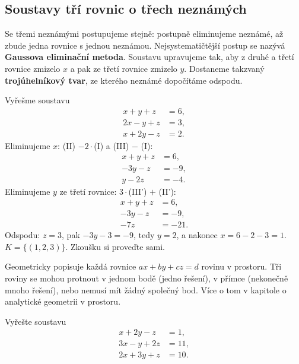 \subsection{Soustavy tří rovnic o třech neznámých}

Se třemi neznámými postupujeme stejně: postupně eliminujeme neznámé, až zbude jedna rovnice s jednou neznámou. Nejsystematičtější postup se nazývá \textbf{Gaussova eliminační metoda}. Soustavu upravujeme tak, aby z druhé a třetí rovnice zmizelo $x$ a pak ze třetí rovnice zmizelo $y$. Dostaneme takzvaný \textbf{trojúhelníkový tvar}, ze kterého neznámé dopočítáme odspodu.

\begin{example}
  Vyřešme soustavu
  \begin{align*}
    x + y + z &= 6, \tag{I}\\
    2x - y + z &= 3, \tag{II}\\
    x + 2y - z &= 2. \tag{III}
  \end{align*}
  Eliminujeme $x$: (II) $- 2\cdot$(I) a (III) $-$ (I):
  \begin{align*}
    x + y + z &= 6,\\
    -3y - z &= -9,\\
    y - 2z &= -4.
  \end{align*}
  Eliminujeme $y$ ze třetí rovnice: $3\cdot$(III') $+$ (II'):
  \begin{align*}
    x + y + z &= 6,\\
    -3y - z &= -9,\\
    -7z &= -21.
  \end{align*}
  Odspodu: $z = 3$, pak $-3y - 3 = -9$, tedy $y = 2$, a nakonec $x = 6 - 2 - 3 = 1$. $K = \{(1, 2, 3)\}$. Zkoušku si proveďte sami.
\end{example}

\begin{note}
  Geometricky popisuje každá rovnice $ax + by + cz = d$ rovinu v prostoru. Tři roviny se mohou protnout v jednom bodě (jedno řešení), v přímce (nekonečně mnoho řešení), nebo nemusí mít žádný společný bod. Více o tom v kapitole o analytické geometrii v prostoru.
\end{note}

\begin{problem}
  Vyřešte soustavu
  \begin{align*}
    x + 2y - z &= 1,\\
    3x - y + 2z &= 11,\\
    2x + 3y + z &= 10.
  \end{align*}
\end{problem}

